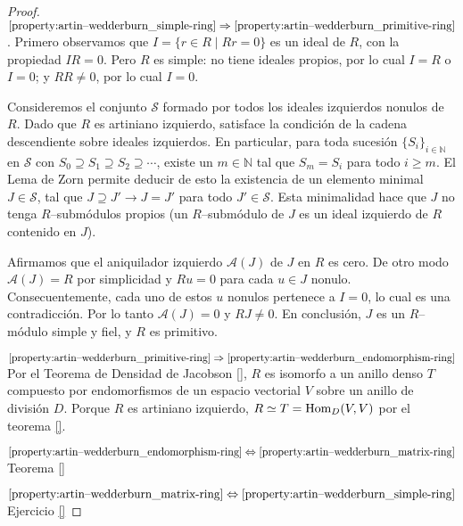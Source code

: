\documentclass{report}
\newcommand{\naturalNumbers}{\mathbb{N}}
\newcommand{\Hom}{\textnormal{Hom}}
\begin{document}
  \begin{proof}
    \(\ref{property:artin--wedderburn_simple-ring} \Rightarrow \ref{property:artin--wedderburn_primitive-ring}\).
    Primero observamos que \(I = \{r \in R \mid R r = 0\}\) es un ideal de \(R\), con la propiedad \(I R = 0\).
    Pero \(R\) es simple: no tiene ideales propios, por lo cual \(I = R\) o \(I = 0\);
    y \(R R \neq 0\), por lo cual \(I = 0\).

    Consideremos el conjunto \(\mathcal{S}\) formado por todos los ideales izquierdos nonulos de \(R\).
    Dado que \(R\) es artiniano izquierdo, satisface la condición de la cadena descendiente sobre ideales izquierdos.
    En particular, para toda sucesión \(\{S_i\}_{i \in \naturalNumbers}\) en \(\mathcal{S}\) con \(S_0 \supseteq S_1 \supseteq S_2 \supseteq \cdots\), existe un \(m \in \naturalNumbers\) tal que \(S_m = S_i\) para todo \(i \geq m\).
    El Lema de Zorn permite deducir de esto la existencia de un elemento minimal \(J \in \mathcal{S}\), tal que \(J \supseteq J' \rightarrow J = J'\) para todo \(J' \in \mathcal{S}\).
    Esta minimalidad hace que \(J\) no tenga \(R\)--submódulos propios (un \(R\)--submódulo de \(J\) es un ideal izquierdo de \(R\) contenido en \(J\)).

    Afirmamos que el aniquilador izquierdo \(\mathcal{A}(J)\) de \(J\) en \(R\) es cero.
    De otro modo \(\mathcal{A}(J) = R\) por simplicidad y \(R u = 0\) para cada \(u \in J\) nonulo.
    Consecuentemente, cada uno de estos \(u\) nonulos pertenece a \(I = 0\), lo cual es una contradicción.
    Por lo tanto \(\mathcal{A}(J) = 0\) y \(R J \neq 0\).
    En conclusión, \(J\) es un \(R\)--módulo simple y fiel, y \(R\) es primitivo.

    \(\ref{property:artin--wedderburn_primitive-ring} \Rightarrow \ref{property:artin--wedderburn_endomorphism-ring}\)
    Por el Teorema de Densidad de Jacobson \ref{}, \(R\) es isomorfo a un anillo denso \(T\) compuesto por endomorfismos de un espacio vectorial \(V\) sobre un anillo de división \(D\).
    Porque \(R\) es artiniano izquierdo, \(R \simeq T = \Hom _D(V, V)\) por el teorema \ref{}.

    \(\ref{property:artin--wedderburn_endomorphism-ring} \Leftrightarrow \ref{property:artin--wedderburn_matrix-ring}\)
    Teorema \ref{}

    \(\ref{property:artin--wedderburn_matrix-ring} \Leftrightarrow \ref{property:artin--wedderburn_simple-ring}\)
    Ejercicio \ref{}
  \end{proof}
\end{document}
